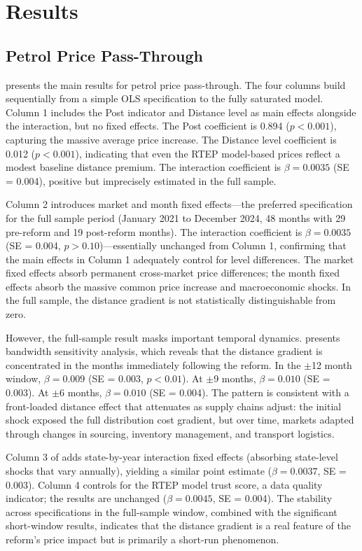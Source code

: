 \documentclass[12pt]{article}
\begin{document}
\section{Results}
\label{sec:results}

\subsection{Petrol Price Pass-Through}

 presents the main results for petrol price pass-through. The four columns build sequentially from a simple OLS specification to the fully saturated model. Column 1 includes the Post indicator and Distance level as main effects alongside the interaction, but no fixed effects. The Post coefficient is 0.894 ($p < 0.001$), capturing the massive average price increase. The Distance level coefficient is 0.012 ($p < 0.001$), indicating that even the RTEP model-based prices reflect a modest baseline distance premium. The interaction coefficient is $\beta = 0.0035$ (SE = 0.004), positive but imprecisely estimated in the full sample.

Column 2 introduces market and month fixed effects---the preferred specification for the full sample period (January 2021 to December 2024, 48 months with 29 pre-reform and 19 post-reform months). The interaction coefficient is $\beta = 0.0035$ (SE = 0.004, $p > 0.10$)---essentially unchanged from Column 1, confirming that the main effects in Column 1 adequately control for level differences. The market fixed effects absorb permanent cross-market price differences; the month fixed effects absorb the massive common price increase and macroeconomic shocks. In the full sample, the distance gradient is not statistically distinguishable from zero.

However, the full-sample result masks important temporal dynamics.  presents bandwidth sensitivity analysis, which reveals that the distance gradient is concentrated in the months immediately following the reform. In the $\pm$12 month window, $\beta = 0.009$ (SE = 0.003, $p < 0.01$). At $\pm$9 months, $\beta = 0.010$ (SE = 0.003). At $\pm$6 months, $\beta = 0.010$ (SE = 0.004). The pattern is consistent with a front-loaded distance effect that attenuates as supply chains adjust: the initial shock exposed the full distribution cost gradient, but over time, markets adapted through changes in sourcing, inventory management, and transport logistics.

Column 3 of  adds state-by-year interaction fixed effects (absorbing state-level shocks that vary annually), yielding a similar point estimate ($\beta = 0.0037$, SE = 0.003). Column 4 controls for the RTEP model trust score, a data quality indicator; the results are unchanged ($\beta = 0.0045$, SE = 0.004). The stability across specifications in the full-sample window, combined with the significant short-window results, indicates that the distance gradient is a real feature of the reform's price impact but is primarily a short-run phenomenon.
\end{document}
